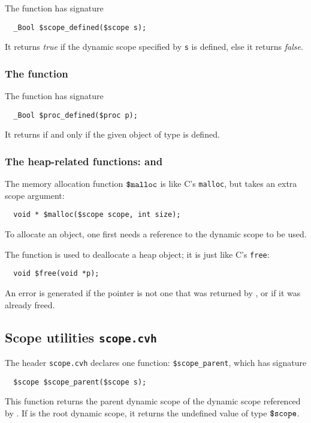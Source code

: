 The function \cscopedefined{} has signature
\begin{verbatim}
  _Bool $scope_defined($scope s);
\end{verbatim}
It returns \emph{true} if the dynamic scope specified by \texttt{s} is
defined, else it returns \emph{false}.

\subsubsection{The \cprocdefined{} function}
\label{subsubsec:procdefined}

The function \cprocdefined{} has signature
\begin{verbatim}
  _Bool $proc_defined($proc p);
\end{verbatim}

It returns \ctrue if and only if the given object of \cproc{} type is defined.


\subsubsection{The heap-related functions: \cmalloc{} and \cfree}
\label{subsubsec:mallocandfree}

The memory allocation function $\mbox{\texttt{\${}malloc}}$ is like C's \texttt{malloc}, but takes
an extra scope argument:
\begin{verbatim}
  void * $malloc($scope scope, int size);
\end{verbatim}
To allocate an object, one first needs a reference to the dynamic scope to be used.

The function \cfree{} is used to deallocate a heap object;
it is just like C's \texttt{free}:
\begin{verbatim}
  void $free(void *p);
\end{verbatim}
An error is generated if the pointer is not one that was returned by
\cmalloc, or if it was already freed.

\subsection{Scope utilities \texttt{scope.cvh}}
\label{subsec:scopeLibrary}

The header \texttt{scope.cvh} declares one function: \texttt{\$scope\_parent}, which has signature

\begin{verbatim}
  $scope $scope_parent($scope s);
\end{verbatim}
This function returns the parent dynamic scope of the dynamic scope referenced by
.  If  is the root dynamic scope, it returns the undefined
value of type $\mbox{\texttt{\${}scope}}$.

